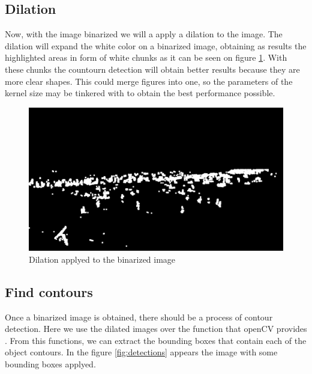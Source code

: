 \documentclass[10pt]{article}
\begin{document}
\subsection{Dilation}
Now, with the image binarized we will a apply a dilation to the image. The dilation will expand the white color on a binarized image, obtaining as results the highlighted areas in form of white chunks as it can be seen on figure \ref{fig:dilation_ex}. With these chunks the countourn detection will obtain better results because they are more clear shapes. This could merge figures into one, so the parameters of the kernel size may be tinkered with to obtain the best performance possible.

\begin{figure} [hp]
    \centering
    \includegraphics[width=\textwidth]{img/dil.jpg}
    \caption{Dilation applyed to the binarized image}
    \label{fig:dilation_ex}
\end{figure}

\subsection{Find contours}
Once a binarized image is obtained, there should be a process of contour detection. Here we use the dilated images over the function that openCV provides . From this functions, we can extract the bounding boxes that contain each of the object contours. In the figure \ref{fig:detections} appears the image with some bounding boxes applyed.
\end{document}
